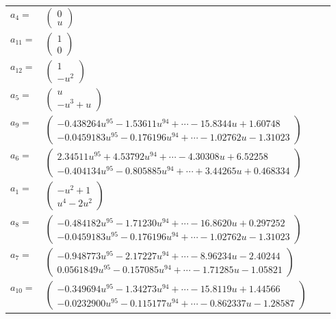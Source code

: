 \documentclass[1p]{elsarticle_modified}
\theoremstyle{definition}
\begin{document}
\begin{tabular}{m{7pt} m{180pt} m{7pt} m{180pt} }
\flushright $a_{4}=$&$\begin{pmatrix}0\\u\end{pmatrix}$ \\
\flushright $a_{11}=$&$\begin{pmatrix}1\\0\end{pmatrix}$ \\
\flushright $a_{12}=$&$\begin{pmatrix}1\\- u^2\end{pmatrix}$ \\
\flushright $a_{5}=$&$\begin{pmatrix}u\\- u^3+u\end{pmatrix}$ \\
\flushright $a_{9}=$&$\begin{pmatrix}-0.438264 u^{95}-1.53611 u^{94}+\cdots-15.8344 u+1.60748\\-0.0459183 u^{95}-0.176196 u^{94}+\cdots-1.02762 u-1.31023\end{pmatrix}$ \\
\flushright $a_{6}=$&$\begin{pmatrix}2.34511 u^{95}+4.53792 u^{94}+\cdots-4.30308 u+6.52258\\-0.404134 u^{95}-0.805885 u^{94}+\cdots+3.44265 u+0.468334\end{pmatrix}$ \\
\flushright $a_{1}=$&$\begin{pmatrix}- u^2+1\\u^4-2 u^2\end{pmatrix}$ \\
\flushright $a_{8}=$&$\begin{pmatrix}-0.484182 u^{95}-1.71230 u^{94}+\cdots-16.8620 u+0.297252\\-0.0459183 u^{95}-0.176196 u^{94}+\cdots-1.02762 u-1.31023\end{pmatrix}$ \\
\flushright $a_{7}=$&$\begin{pmatrix}-0.948773 u^{95}-2.17227 u^{94}+\cdots-8.96234 u-2.40244\\0.0561849 u^{95}-0.157085 u^{94}+\cdots-1.71285 u-1.05821\end{pmatrix}$ \\
\flushright $a_{10}=$&$\begin{pmatrix}-0.349694 u^{95}-1.34273 u^{94}+\cdots-15.8119 u+1.44566\\-0.0232900 u^{95}-0.115177 u^{94}+\cdots-0.862337 u-1.28587\end{pmatrix}$ \\

\end{tabular}
\end{document}

